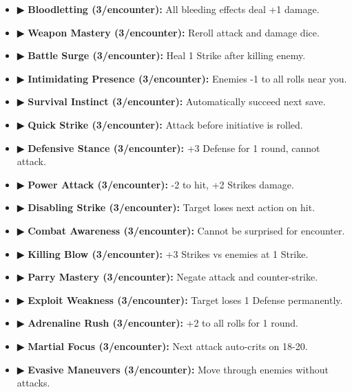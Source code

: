 \documentclass[10pt,twoside]{article}
\begin{document}
\begin{multicols}{2}
{\begin{itemize}
\item ▶ \textbf{Bloodletting (3/encounter):} All bleeding effects deal +1 damage.

\item ▶ \textbf{Weapon Mastery (3/encounter):} Reroll attack and damage dice.

\item ▶ \textbf{Battle Surge (3/encounter):} Heal 1 Strike after killing enemy.

\item ▶ \textbf{Intimidating Presence (3/encounter):} Enemies -1 to all rolls near you.

\item ▶ \textbf{Survival Instinct (3/encounter):} Automatically succeed next save.

\item ▶ \textbf{Quick Strike (3/encounter):} Attack before initiative is rolled.

\item ▶ \textbf{Defensive Stance (3/encounter):} +3 Defense for 1 round, cannot attack.

\item ▶ \textbf{Power Attack (3/encounter):} -2 to hit, +2 Strikes damage.

\item ▶ \textbf{Disabling Strike (3/encounter):} Target loses next action on hit.

\item ▶ \textbf{Combat Awareness (3/encounter):} Cannot be surprised for encounter.

\item ▶ \textbf{Killing Blow (3/encounter):} +3 Strikes vs enemies at 1 Strike.

\item ▶ \textbf{Parry Mastery (3/encounter):} Negate attack and counter-strike.

\item ▶ \textbf{Exploit Weakness (3/encounter):} Target loses 1 Defense permanently.

\item ▶ \textbf{Adrenaline Rush (3/encounter):} +2 to all rolls for 1 round.

\item ▶ \textbf{Martial Focus (3/encounter):} Next attack auto-crits on 18-20.

\item ▶ \textbf{Evasive Maneuvers (3/encounter):} Move through enemies without attacks.


\end{itemize}}
\end{multicols}
\end{document}
